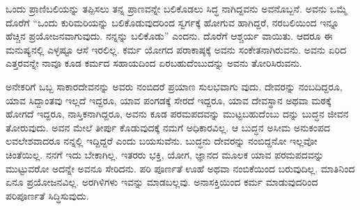 ಒಂದು ಪ್ರಾಣಿಬಲಿಯನ್ನು ತಪ್ಪಿಸಲು ತನ್ನ ಪ್ರಾಣವನ್ನೇ ಬಲಿಕೊಡಲು ಸಿದ್ಧ ನಾಗಿದ್ದವನು ಅವನೊಬ್ಬನೆ. ಅವನು ಒಮ್ಮೆ ದೊರೆಗೆ “ಒಂದು ಕುರಿಮರಿಯನ್ನು ಬಲಿಕೊಡುವುದರಿಂದ ಸ್ವರ್ಗಕ್ಕೆ ಹೋಗುವ ಹಾಗಿದ್ದರೆ, ನರಬಲಿಯಿಂದ ಇನ್ನೂ ಹೆಚ್ಚಿನ ಪ್ರಯೋಜನವಾಗುವುದು. ನನ್ನನ್ನು ಬಲಿಕೊಡು” ಎಂದನು. ದೊರೆಗೆ ಆಶ್ಚರ್ಯ ವಾಯಿತು. ಆದರೂ ಈ ಮನುಷ್ಯನಲ್ಲಿ ಎಳ್ಳಷ್ಟೂ ಆಸೆ ಇರಲಿಲ್ಲ. ಕರ್ಮ ಯೋಗದ ಪರಾಕಾಷ್ಠಕ್ಕೆ ಅವನು ಸಂಕೇತನಾಗಿರುವನು. ಅವನು ಏರಿದ ಎತ್ತರವನ್ನೇ ನಾವೂ ಕೂಡ ಕರ್ಮದ ಸಹಾಯದಿಂದ ಏರಬಹುದೆಂಬುದನ್ನು ಅವನು ತೋರಿಸಿರುವನು.

ಅನೇಕರಿಗೆ ಒಬ್ಬ ಸಾಕಾರದೇವನನ್ನು ಅವರು ನಂಬಿದರೆ ಪ್ರಯಾಣ ಸುಲಭವಾಗು ವುದು. ದೇವರನ್ನು ನಂಬದಿದ್ದರೂ, ಯಾವ ಸಿದ್ದಾಂತವು ಇಲ್ಲದೆ ಇದ್ದರೂ, ಯಾವ ಪಂಗಡಕ್ಕೆ ಸೇರದೆ ಇದ್ದರೂ, ಯಾವ ದೇವಸ್ಥಾನ ಅಥವಾ ಮಠಕ್ಕೆ ಹೋಗದೆ ಇದ್ದರೂ, ನಾಸ್ತಿಕನಾಗಿದ್ದರೂ, ಅವನು ಕೂಡ ಪರಮಪದವನ್ನು ಮುಟ್ಟಬಹುದೆಂಬು ದನ್ನು ಬುದ್ಧನ ಜೀವನ ತೋರುವುದು. ಅವನ ಮೇಲೆ ತೀರ್ಪು ಕೊಡುವುದಕ್ಕೆ ನಮಗೆ ಅಧಿಕಾರವಿಲ್ಲ. ಆ ಬುದ್ಧನ ಅಸೀಮ ಅನುಕಂಪದ ಲವಲೇಶವಾದರೂ ನನ್ನಲ್ಲಿ ಇದ್ದಿದ್ದರೆ ಎಂದು ಬಯಸುವೆನು. ಬುದ್ಧನು ದೇವರನ್ನು ನಂಬಿದ್ದನೋ ಇಲ್ಲವೋ ಚಿಂತೆಯಿಲ್ಲ. ನನಗೆ ಇದು ಬೇಕಾಗಿಲ್ಲ. ಇತರರು ಭಕ್ತಿ, ಯೋಗ, ಜ್ಞಾನದ ಮೂಲಕ ಯಾವ ಪರಮಪದವನ್ನು ಮುಟ್ಟುವರೋ ಅದನ್ನೇ ಅವನೂ ಸೇರಿದನು. ಪರಿ ಪೂರ್ಣತೆ ಊಹೆ ಅಥವಾ ನಂಬಿಕೆಯಿಂದ ಬರುವುದಿಲ್ಲ. ಮಾತಿನಿಂದ ಏನೂ ಪ್ರಯೋಜನವಿಲ್ಲ. ಅರಗಿಳಿಗಳು ಇವನ್ನು ಮಾಡಬಲ್ಲವು. ಅನಾಸಕ್ತಿಯಿಂದ ಕರ್ಮ ಮಾಡುವುದರಿಂದ ಪರಿಪೂರ್ಣತೆ ಸಿದ್ಧಿಸುವುದು.

